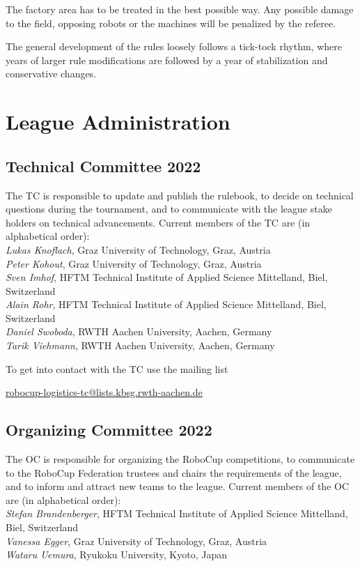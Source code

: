 \documentclass[12pt,twoside]{article}
\begin{document}
The factory area has to be treated in the best possible way.
Any possible damage to the field, opposing robots or the machines will be
penalized by the referee.

The general development of the rules loosely follows a tick-tock
rhythm, where years of larger rule modifications are followed by a
year of stabilization and conservative changes.


\section{League Administration} \label{sec:commitees}
\subsection{Technical Committee 2022}
\label{sec:tc}
The \acf{TC} is responsible to update and publish the
rulebook, to decide on technical questions during the tournament, and
to communicate with the league stake holders on technical
advancements. Current members of the \ac{TC} are
(in alphabetical order):\\[.5em]
\emph{Lukas Knoflach}, Graz University of Technology, Graz, Austria\\
\emph{Peter Kohout}, Graz University of Technology, Graz, Austria\\
\emph{Sven Imhof}, HFTM Technical Institute of Applied Science Mittelland,
Biel, Switzerland\\
\emph{Alain Rohr}, HFTM Technical Institute of Applied Science Mittelland,
Biel, Switzerland\\
\emph{Daniel Swoboda}, RWTH Aachen University, Aachen, Germany\\
\emph{Tarik Viehmann}, RWTH Aachen University, Aachen, Germany

\medskip
\noindent To get into contact with the \ac{TC} use the mailing list\\
\centerline{\url{robocup-logistics-tc@lists.kbsg.rwth-aachen.de}}

\subsection{Organizing Committee 2022}
\label{sec:oc}
The \ac{OC} is responsible for organizing the
RoboCup competitions, to communicate to the RoboCup Federation
trustees and chairs the requirements of the league, and to inform and
attract new teams to the league. Current members of the \ac{OC} are (in
alphabetical order):\\[.5em]
\emph{Stefan Brandenberger}, HFTM Technical Institute of Applied Science
Mittelland, Biel, Switzerland\\
\emph{Vanessa Egger}, Graz University of Technology, Graz, Austria\\
\emph{Wataru Uemura}, Ryukoku University, Kyoto, Japan
\end{document}
